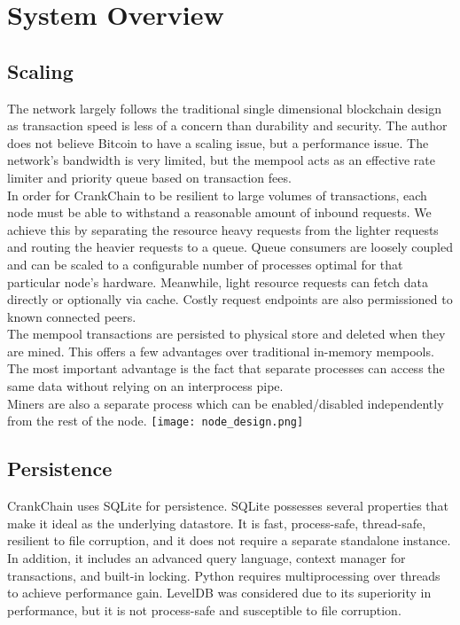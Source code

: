 \documentclass[10pt,twocolumn]{article}
\begin{document}
\section{System Overview}
\subsection{Scaling}
The network largely follows the traditional single dimensional blockchain design as transaction speed is less of a concern than durability and security.  The author does not believe Bitcoin to have a scaling issue, but a performance issue.  The network's bandwidth is very limited, but the mempool acts as an effective rate limiter and priority queue based on transaction fees.\\
In order for CrankChain to be resilient to large volumes of transactions, each node must be able to withstand a reasonable amount of inbound requests.  We achieve this by separating the resource heavy requests from the lighter requests and routing the heavier requests to a queue.  Queue consumers are loosely coupled and can be scaled to a configurable number of processes optimal for that particular node's hardware.  Meanwhile, light resource requests can fetch data directly or optionally via cache.  Costly request endpoints are also permissioned to known connected peers.\\
The mempool transactions are persisted to physical store and deleted when they are mined.  This offers a few advantages over traditional in-memory mempools.  The most important advantage is the fact that separate processes can access the same data without relying on an interprocess pipe.\\
Miners are also a separate process which can be enabled/disabled independently from the rest of the node.
\texttt{[image: node\_design.png]}
\subsection{Persistence}
CrankChain uses SQLite for persistence.  SQLite possesses several properties that make it ideal as the underlying datastore.  It is fast, process-safe, thread-safe, resilient to file corruption, and it does not require a separate standalone instance.  In addition, it includes an advanced query language, context manager for transactions, and built-in locking.  Python requires multiprocessing over threads to achieve performance gain.  LevelDB was considered due to its superiority in performance, but it is not process-safe and susceptible to file corruption.
\end{document}

